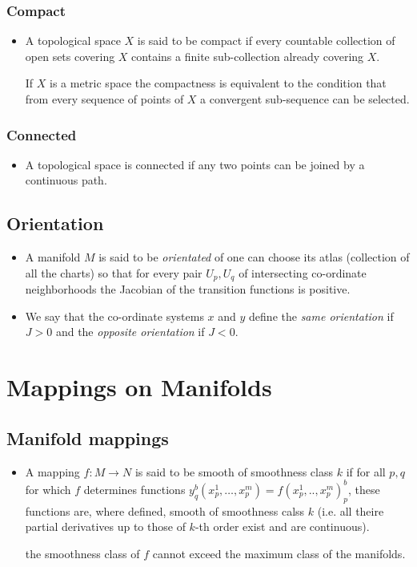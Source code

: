 \documentclass[11pt]{article}
\numberwithin{equation}{section}
\begin{document}
\subsubsection{Compact}
\begin{itemize}
  \item A topological space $X$ is said to be compact if every countable collection of open sets covering $X$ contains a finite sub-collection already covering $X$.

  If $X$ is a metric space the compactness is equivalent to the condition that from every sequence of points of $X$ a convergent sub-sequence can be selected.  
\end{itemize}
\subsubsection{Connected}
\begin{itemize}
  \item A topological space is connected if any two points can be joined by a continuous path. 
\end{itemize}

\subsection{Orientation}
\begin{itemize}
  \item A manifold $M$ is said to be \emph{orientated} of one can choose its atlas (collection of all the charts) so that for every pair $U_{p},U_{q}$ of intersecting co-ordinate neighborhoods the Jacobian of the transition functions is positive.  

  \item We say that the co-ordinate systems $x$ and $y$ define the \emph{same orientation} if $J>0$ and the \emph{opposite orientation} if $J<0$. 
\end{itemize}
\newpage
\section{Mappings on Manifolds}
\subsection{Manifold mappings}
\begin{itemize}
  \item A mapping $f: M \rightarrow N$ is said to be smooth of smoothness class $k$ if for all $p,q$ for which $f$ determines functions $y^{b}_{q}(x^{1}_{p},\ldots,x^{m}_{p}) = f(x^{1}_{p},..,x^m_p)^{b}_{p}$, these functions are, where defined, smooth of smoothness calss $k$ (i.e. all theire partial derivatives up to those of $k$-th order exist and are continuous).

  the smoothness class of $f$ cannot exceed the maximum class of the manifolds.  
\end{itemize}
\end{document}
